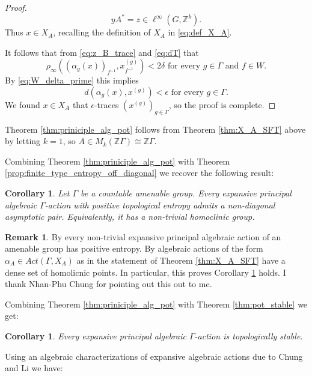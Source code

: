 \documentclass[oneside,english]{amsart}
\newtheorem{cor}[thm]{Corollary}
\theoremstyle{definition}
\newtheorem{remark}[thm]{Remark}
\newcommand{\Act}[2]{\mathit{Act}({#1},{#2})}
\begin{document}
\begin{proof}
$$y A^*= z\in  \ell^\infty(G,\mathbb{Z}^k).$$
Thus $x \in X_A$, recalling the definition of $X_A$ in \eqref{eq:def_X_A}.

It follows that from \eqref{eq:z_B_trace} and \eqref{eq:dT} that
$$\rho_{\infty}((\alpha_g(x))_{f^{-1}},x^{(g)}_{f^{-1}}) < 2\delta \mbox{ for every } g \in \Gamma \mbox{ and } f \in W.$$
By  \eqref{eq:W_delta_prime}  this implies
$$d(\alpha_g(x),x ^{(g)}) < \epsilon \mbox{ for every } g \in \Gamma.$$
We found $x \in X_A$  that  $\epsilon$-traces $(x^{(g)})_{g \in \Gamma}$, so the proof is complete.
\end{proof}

Theorem \ref{thm:priniciple_alg_pot} follows from Theorem \ref{thm:X_A_SFT} above by letting $k=1$, so $A \in M_k(\mathbb{Z}\Gamma) \cong \mathbb{Z}\Gamma$.

Combining Theorem \ref{thm:priniciple_alg_pot} with Theorem \ref{prop:finite_type_entropy_off_diagonal} we recover the following result:
\begin{cor}\label{cor:princ_alg_homoc}
Let $\Gamma$ be a countable amenable group. Every expansive principal algebraic $\Gamma$-action with positive topological entropy admits a non-diagonal asymptotic pair.
Equivalently, it has a non-trivial homoclinic group.
\end{cor}

\begin{remark}\label{rem:princ_alg} By \cite[Corollary $7.9$]{MR3314515} every non-trivial expansive principal algebraic action of an amenable group has positive entropy.
By  \cite[Lemma $5.4$]{MR3314515}  algebraic actions of the  form $\alpha_A \in \Act{\Gamma}{X_A}$ as in the statement of Theorem \ref{thm:X_A_SFT} have a dense set of homolicnic points. In particular, this proves Corollary \ref{cor:princ_alg_homoc} holds. I thank Nhan-Phu Chung for pointing out this out to me.
\end{remark}

Combining Theorem \ref{thm:priniciple_alg_pot} with Theorem \ref{thm:pot_stable} we get:
\begin{cor}\label{cor:princ_alg_stbl}
Every expansive principal algebraic $\Gamma$-action  is topologically stable.
\end{cor}

Using an algebraic characterizations of expansive algebraic actions due to Chung and Li we have:
\end{document}
